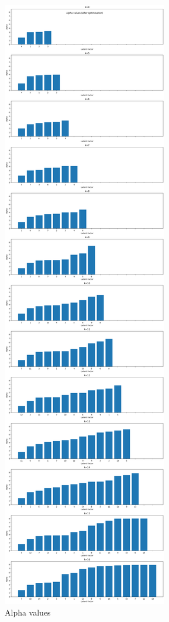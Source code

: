 \documentclass[12pt]{article}
\begin{document}
\begin{figure}[h]
\begin{minipage}{.2\textwidth}
\includegraphics[scale=0.11]{outputs/q4/b-alpha-trained}
\caption{Alpha values}
\label{fig:}
\end{minipage}
\end{figure}
\end{document}

